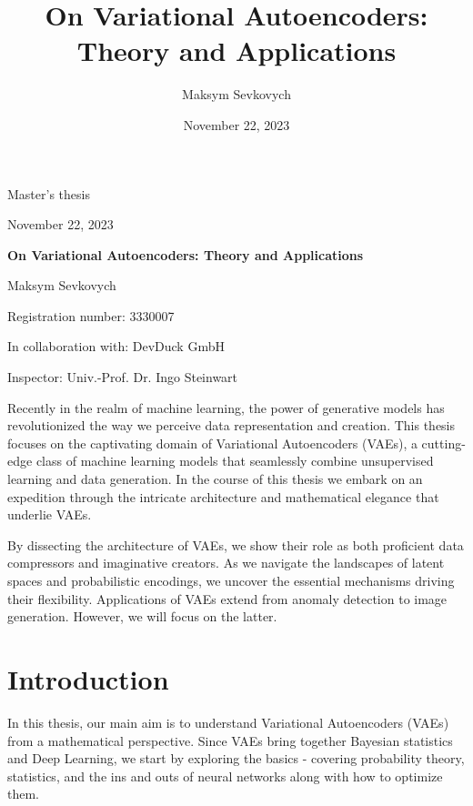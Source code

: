 \documentclass[11pt, twoside, a4paper]{book}
\title{On Variational Autoencoders: Theory and Applications}
\date{November 22, 2023}
\author{Maksym Sevkovych}
\theoremstyle{plain}
\theoremstyle{definition}
\theoremstyle{plain}
\begin{document}
\begin{titlepage}
\vspace*{1 cm}
\begin{center}
\LARGE{Master's thesis}

\vspace{0.5 cm}

\large{November 22, 2023}

\vspace{0.5 cm}

\Huge{\textbf{On Variational Autoencoders: Theory and Applications}}

\vspace{0.5 cm}

\Large{Maksym Sevkovych}

\Large{Registration number: 3330007}

\Large{In collaboration with: DevDuck GmbH}
\vspace{1 cm}

\Large{Inspector: Univ.-Prof. Dr. Ingo Steinwart}
\vspace{3cm}
\end{center}
Recently in the realm of machine learning, the power of generative models has revolutionized the way we perceive data representation and creation. This thesis focuses on the captivating domain of Variational Autoencoders (VAEs), a cutting-edge class of machine learning models that seamlessly combine unsupervised learning and data generation. In the course of this thesis we embark on an expedition through the intricate architecture and mathematical elegance that underlie VAEs.

By dissecting the architecture of VAEs, we show their role as both proficient data compressors and imaginative creators. As we navigate the landscapes of latent spaces and probabilistic encodings, we uncover the essential mechanisms driving their flexibility.
Applications of VAEs extend from anomaly detection to image generation. However, we will focus on the latter.
\end{titlepage}
\newpage
\tableofcontents
\newpage
\section*{Introduction}
In this thesis, our main aim is to understand Variational Autoencoders (VAEs) from a mathematical perspective. Since VAEs bring together Bayesian statistics and Deep Learning, we start by exploring the basics - covering probability theory, statistics, and the ins and outs of neural networks along with how to optimize them.
\end{document}
